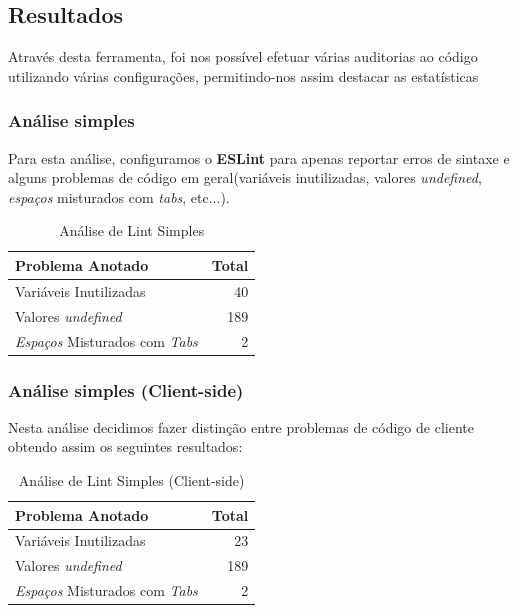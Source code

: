\documentclass[a4paper,12pt]{article} %
\begin{document}
\newpage
\subsection{Resultados}
Através desta ferramenta, foi nos possível efetuar várias auditorias ao código utilizando várias configurações, permitindo-nos assim destacar as estatísticas

\subsubsection{Análise simples}
Para esta análise, configuramos o \textbf{ESLint} para apenas reportar erros de sintaxe e alguns problemas de código em geral(variáveis inutilizadas, valores \textit{undefined}, \textit{espaços} misturados com \textit{tabs}, etc...).

\vspace{1cm}
\begin{table}[H]
	\centering
	\begin{tabular}{|l|r|}
		\hline
		\textbf{Problema Anotado} & \textbf{Total} \\
		\hline
		Variáveis Inutilizadas & 40 \\
		\hline
		Valores \textit{undefined} & 189 \\
		\hline
		\textit{Espaços} Misturados com \textit{Tabs} & 2 \\
		\hline
	\end{tabular}
	\caption{Análise de Lint Simples}
\end{table}

\subsubsection{Análise simples (Client-side)}
Nesta análise decidimos fazer distinção entre problemas de código de cliente obtendo assim os seguintes resultados:

\vspace{1cm}
\begin{table}[H]
	\centering
	\begin{tabular}{|l|r|}
		\hline
		\textbf{Problema Anotado} & \textbf{Total} \\
		\hline
		Variáveis Inutilizadas & 23 \\
		\hline
		Valores \textit{undefined} & 189 \\
		\hline
		\textit{Espaços} Misturados com \textit{Tabs} & 2 \\
		\hline
	\end{tabular}
	\caption{Análise de Lint Simples (Client-side)}
\end{table}
\end{document}
